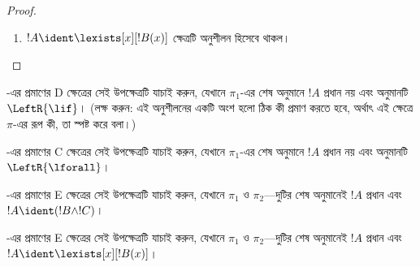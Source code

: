 \documentclass[../../../include/open-logic-section]{subfiles}
\begin{document}
\begin{proof}
\begin{enumerate}
!!{proof}~$\pi_1'$-এর অন্তিম সিকোয়েন্ট
$\Gamma \Sequent \Delta, !B(c)$, যেখানে $c$ হলো
$\RightR{\lforall}$ অনুমানের আইগেনচল। তাই $!B(x)$,
$\Gamma$ বা~$\Delta$-তে $c$ নেই। ধরি, !!{proof}~$\pi$
নিয়মিত; ফলে $c$ শুধু পরবর্তী~$\RightR{\lforall}$ অনুমানেরই
আইগেনচল এবং শুধু তার উপরে, অর্থাৎ $\pi_1'$-এ আছে;
$\pi_1'$-এর কোনো অনুমানের আইগেনচল নয়। $\pi_2$-তে
$c$ নেই বলে $t$-তেও নেই।
 অনুযায়ী
!!{proof}~$\Subst{\pi_1'}{t}{c}$ হলো
$\Gamma \Sequent \Delta, !B(t)$-র !!a{proof}। এবার এই
!!{proof}-এ আরোহের অনুমান প্রয়োগ করি:
\[
\AxiomC{}
\RightLabel{$\Subst{\pi_1'}{t}{c}$}
\Deduce$\Gamma \fCenter \Delta, !B(t)$
\AxiomC{}
\RightLabel{$\pi_2''$}
\Deduce$!B(t), \Gamma \fCenter \Delta$
\RightLabel{\CutCS}
\BinaryInf$\Gamma \fCenter \Delta$
\DisplayProof
\]
(এখানে কর্তন-!!{formula}~$!B(t)$ হওয়ায় !!{proof}-টির
কর্তনমাত্রা $\pi$-এর চেয়ে কম; তাই আরোহের অনুমান প্রযোজ্য।)
\item $!A \ident \lexists[x][!B(x)]$ ক্ষেত্রটি অনুশীলন হিসেবে থাকল।
\end{enumerate}
\end{proof}

\begin{prob}
-এর প্রমাণের D ক্ষেত্রের সেই উপক্ষেত্রটি
যাচাই করুন, যেখানে $\pi_1$-এর শেষ অনুমানে $!A$ প্রধান নয়
এবং অনুমানটি~$\LeftR{\lif}$। (লক্ষ করুন: এই অনুশীলনের
একটি অংশ হলো ঠিক কী প্রমাণ করতে হবে, অর্থাৎ এই ক্ষেত্রে
$\pi$-এর রূপ কী, তা স্পষ্ট করে বলা।)
\end{prob}

\begin{prob}
-এর প্রমাণের C ক্ষেত্রের সেই উপক্ষেত্রটি
যাচাই করুন, যেখানে $\pi_1$-এর শেষ অনুমানে $!A$ প্রধান নয়
এবং অনুমানটি~$\LeftR{\lforall}$।
\end{prob}

\begin{prob}
-এর প্রমাণের E ক্ষেত্রের সেই উপক্ষেত্রটি
যাচাই করুন, যেখানে $\pi_1$ ও $\pi_2$—দুটির শেষ অনুমানেই
$!A$ প্রধান এবং $!A \ident (!B \land !C)$।
\end{prob}

\begin{prob}
-এর প্রমাণের E ক্ষেত্রের সেই উপক্ষেত্রটি
যাচাই করুন, যেখানে $\pi_1$ ও $\pi_2$—দুটির শেষ অনুমানেই
$!A$ প্রধান এবং $!A \ident \lexists[x][!B(x)]$।
\end{prob}
\end{document}
